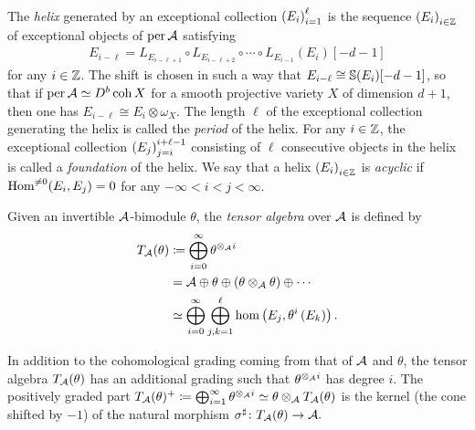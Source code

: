 \documentclass[a4paper,12pt]{amsart}
\begin{document}
The \emph{helix}
generated by an exceptional collection $\left( E_i \right)_{i=1}^\ell$
is the sequence $\left( E_i \right)_{i \in \mathbb{Z}}$
of exceptional objects of $\operatorname{per} \mathcal{A}$
satisfying
\begin{align}
 E_{i-\ell} = L_{E_{i-\ell+1}} \circ L_{E_{i-\ell+2}}
  \circ \cdots \circ L_{E_{i-1}}(E_i)[ - d - 1 ]
\end{align}
for any $i \in \mathbb{Z}$.
The shift is chosen in such a way that
$E_{i-\ell} \cong \mathbb{S}(E_i)[-d-1]$,
so that
if
$\operatorname{per} \mathcal{A} \simeq D^b \operatorname{coh} X$
for a smooth projective variety $X$
of dimension $d+1$,
then one has
$E_{i-\ell} \cong E_i \otimes \omega_X$.
The length $\ell$ of the exceptional collection
generating the helix is called the \emph{period} of the helix.
For any $i \in \mathbb{Z}$,
the exceptional collection $\left( E_j \right)_{j=i}^{i+\ell-1}$
consisting of $\ell$ consecutive objects in the helix
is called a \emph{foundation}
of the helix.
We say that
a helix $\left( E_i \right)_{i \in \mathbb{Z}}$ is \emph{acyclic}
if
$
 \operatorname{Hom}^{\ne 0}(E_i, E_j) = 0
$
for any $-\infty < i < j < \infty$.

Given an invertible $\mathcal{A}$-bimodule $\theta$,
the \emph{tensor algebra} over $\mathcal{A}$ is defined by
\begin{align}
T_{\mathcal{A}}(\theta)
&\coloneqq \bigoplus_{i=0}^\infty \theta^{\otimes_{\mathcal{A}} i} \\
&= \mathcal{A} \oplus \theta
\oplus \left( \theta \otimes_{\mathcal{A}} \theta  \right)
\oplus \cdots \\
&\simeq \bigoplus_{i=0}^\infty \bigoplus_{j,k=1}^\ell
\hom\left( E_j, \theta^i \left( E_k \right) \right).
\end{align}

In addition to the cohomological grading
coming from that of $\mathcal{A}$ and $\theta$,
the tensor algebra $T_{\mathcal{A}}(\theta)$
has an additional grading
such that $\theta^{\otimes_{\mathcal{A}} i}$ has degree $i$.
The positively graded part
$
T_{\mathcal{A}}(\theta)^+
\coloneqq \bigoplus_{i=1}^\infty \theta^{\otimes_{\mathcal{A}} i}
\simeq \theta \otimes_{\mathcal{A}} T_{\mathcal{A}}(\theta)
$
is
the kernel
(the cone shifted by $-1$)
of the natural morphism
$
\sigma^\sharp \colon T_{\mathcal{A}}(\theta) \to \mathcal{A}.
$
\end{document}
